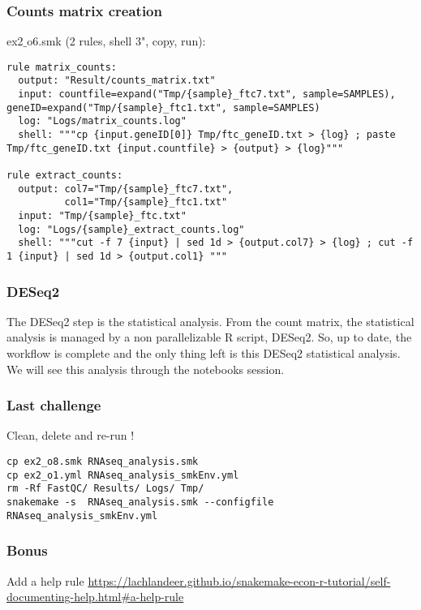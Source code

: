 \begin{frame}[containsverbatim]
\frametitle{Counts matrix creation}
\begin{exampleblock}{ex2$\_$o6.smk (2 rules, shell 3", copy, run):}
\begin{lstlisting}
rule matrix_counts:
  output: "Result/counts_matrix.txt"
  input: countfile=expand("Tmp/{sample}_ftc7.txt", sample=SAMPLES), geneID=expand("Tmp/{sample}_ftc1.txt", sample=SAMPLES)
  log: "Logs/matrix_counts.log"
  shell: """cp {input.geneID[0]} Tmp/ftc_geneID.txt > {log} ; paste Tmp/ftc_geneID.txt {input.countfile} > {output} > {log}"""

rule extract_counts:
  output: col7="Tmp/{sample}_ftc7.txt",
          col1="Tmp/{sample}_ftc1.txt"
  input: "Tmp/{sample}_ftc.txt"
  log: "Logs/{sample}_extract_counts.log"
  shell: """cut -f 7 {input} | sed 1d > {output.col7} > {log} ; cut -f 1 {input} | sed 1d > {output.col1} """
\end{lstlisting}
\end{exampleblock}
\end{frame}
\begin{frame}[containsverbatim]
\frametitle{DESeq2}
The DESeq2 step is the statistical analysis. From the count matrix, the statistical analysis is managed by a non parallelizable R script, DESeq2.
\vfill
So, up to date, the workflow is complete and the only thing left is this DESeq2 statistical analysis. We will see this analysis through the notebooks session.
\end{frame}
\begin{frame}[containsverbatim]
\frametitle{Last challenge}
\begin{exampleblock}{}
Clean, delete and re-run !
\begin{lstlisting}
cp ex2_o8.smk RNAseq_analysis.smk
cp ex2_o1.yml RNAseq_analysis_smkEnv.yml
rm -Rf FastQC/ Results/ Logs/ Tmp/ 
snakemake -s  RNAseq_analysis.smk --configfile RNAseq_analysis_smkEnv.yml
\end{lstlisting}
\end{exampleblock}
\end{frame}
\begin{frame}[containsverbatim]
\frametitle{Bonus}
\begin{exampleblock}{Add a help rule}
\url{https://lachlandeer.github.io/snakemake-econ-r-tutorial/self-documenting-help.html#a-help-rule}
\end{exampleblock}
\end{frame}
